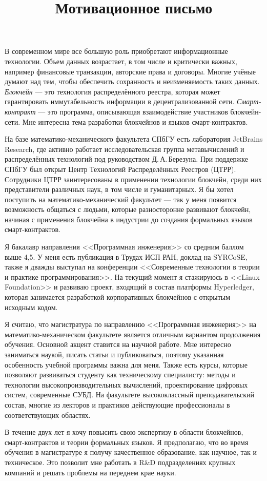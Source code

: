 \documentclass[12pt,a4paper]{article}
\begin{document}
\title{Мотивационное письмо}
\date{}
\author{}
\maketitle
\thispagestyle{empty}
В современном мире все большую роль приобретают информационные технологии.
Объем данных возрастает, в том числе и критически важных, например финансовые транзакции, авторские права и договоры.
Многие учёные думают над тем, чтобы обеспечить сохранность и неизменяемость таких данных.
\emph{Блокчейн} --- это технология распределённого реестра, которая может гарантировать иммутабельность информации в децентрализованной сети.
\emph{Смарт-контракт} --- это программа, описывающая взаимодействие участников блокчейн-сети. 
Мне интересна тема разработки блокчейнов и языков смарт-контрактов.

На базе математико-механического факультета СПбГУ есть лаборатория JetBrains Re\-se\-arch, где активно работает исследовательская группа метавычислений и распределённых технологий под руководством Д.\,А.\,Бе\-ре\-зу\-на.
При поддержке СПбГУ был открыт Центр Технологий Распределённых Реестров (ЦТРР). 
Сотрудники ЦТРР заинтересованы в применении технологии блокчейн, среди них представители различных наук, в том числе и гуманитарных.
Я бы хотел поступить на ма\-те\-ма\-ти\-ко-ме\-ха\-ни\-чес\-кий факультет --- так у меня появится возможность общаться с людьми, которые разносторонне развивают блокчейн, начиная с применения блокчейна в индустрии до создания  формальных языков смарт-контрактов.

Я бакалавр направления <<Программная инженерия>> со средним баллом выше 4,5.
У меня есть публикация в Трудах ИСП РАН, доклад на SYRCoSE, также я дважды выступал на конференции <<Современные технологии в теории и практике программирования>>.
На текущий момент я стажируюсь в <<Linux Foundation>> и развиваю проект, входящий в состав платформы Hyperledger, которая занимается разработкой корпоративных блокчейнов с открытым исходным кодом.

Я считаю, что магистратура по направлению <<Программная инженерия>> на ма\-те\-ма\-ти\-ко-ме\-ха\-ни\-чес\-ком факультете является отличным вариантом продолжения обучения.
Основной акцент ставится на научной работе.
Мне интересно заниматься наукой, писать статьи и публиковаться, поэтому указанная особенность учебной программы важна для меня.
Также есть курсы, которые позволяют развиваться студенту как техническому специалисту: методы и технологии высокопроизводительных вычислений, проектирование цифровых систем, современные СУБД.
На факультете высококлассный преподавательский состав, многие из лекторов и практиков действующие профессионалы в соответствующих областях.

В течение двух лет я хочу повысить свою экспертизу в области блокчейнов, смарт-кон\-трак\-тов и теории формальных языков.
Я предполагаю, что во время обучения в магистратуре я получу качественное образование, как научное, так и техническое.
Это позволит мне работать в R\&D подразделениях крупных компаний и решать проблемы на переднем крае науки.
\end{document}
